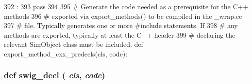 \begin{DoxyCode}
392                                  :
393         pass
394 
395     # Generate the code needed as a prerequisite for the C++ methods
396     # exported via export_methods() to be compiled in the _wrap.cc
397     # file.  Typically generates one or more #include statements.  If
398     # any methods are exported, typically at least the C++ header
399     # declaring the relevant SimObject class must be included.
    def export_method_cxx_predecls(cls, code):
\end{DoxyCode}
\hypertarget{classm5_1_1SimObject_1_1MetaSimObject_a83526365333b680bfcbd9b037527cc25}{
\subsubsection[{swig\_\-decl}]{\setlength{\rightskip}{0pt plus 5cm}def swig\_\-decl ( {\em cls}, \/   {\em code})}}
\label{classm5_1_1SimObject_1_1MetaSimObject_a83526365333b680bfcbd9b037527cc25}



